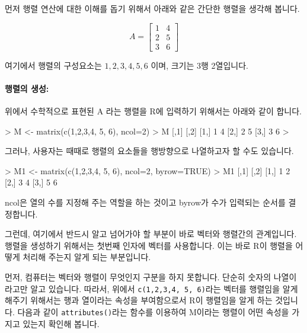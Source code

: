 먼저 행렬 연산에 대한 이해를 돕기 위해서 아래와 같은 간단한 행렬을 생각해 봅니다. 

\begin{equation}
A = 
\begin{bmatrix}
1 & 4 \\
2 & 5 \\
3 & 6
\end{bmatrix}
\end{equation}

여기에서 행렬의 구성요소는 $1,2,3,4, 5, 6$ 이며, 크기는 3행 2열입니다.

\paragraph{행렬의 생성:} 위에서 수학적으로 표현된 A 라는 행렬을 R에 입력하기 위해서는 아래와 같이 합니다. 

\begin{Schunk}
\begin{Soutput}
> M <- matrix(c(1,2,3,4, 5, 6), ncol=2)
> M
     [,1] [,2]
[1,]    1    4
[2,]    2    5
[3,]    3    6
>
\end{Soutput}
\end{Schunk}

그러나, 사용자는 때때로 행렬의 요소들을 행방향으로 나열하고자 할 수도 있습니다. 
\begin{Schunk}
\begin{Soutput}
> M1 <- matrix(c(1,2,3,4, 5, 6), ncol=2, byrow=TRUE)
> M1
     [,1] [,2]
[1,]    1    2
[2,]    3    4
[3,]    5    6

\end{Soutput}
\end{Schunk}

ncol은 열의 수를 지정해 주는 역할을 하는 것이고 byrow가 수가 입력되는 순서를 결정합니다.

그런데, 여기에서 반드시 알고 넘어가야 할 부분이 바로 벡터와 행렬간의 관계입니다. 
행렬을 생성하기 위해서는 첫번째 인자에 벡터를 사용합니다. 
이는 바로 R이 행렬을 어떻게 처리해 주는지 알게 되는 부분입니다. 

먼저, 컴퓨터는 벡터와 행렬이 무엇인지 구분을 하지 못합니다. 
단순히 숫자의 나열이라고만 알고 있습니다. 
따라서, 위에서 \texttt{c(1,2,3,4, 5, 6)}라는 벡터를 행렬임을 알게 해주기 위해서는 행과 열이라는 속성을 부여함으로서 
R이 행렬임을 알게 하는 것입니다.
다음과 같이 \texttt{attributes()}라는 함수를 이용하여 M이라는 행렬이 어떤 속성을 가지고 있는지 확인해 봅니다. 

\begin{Schunk}
\end{Schunk}

